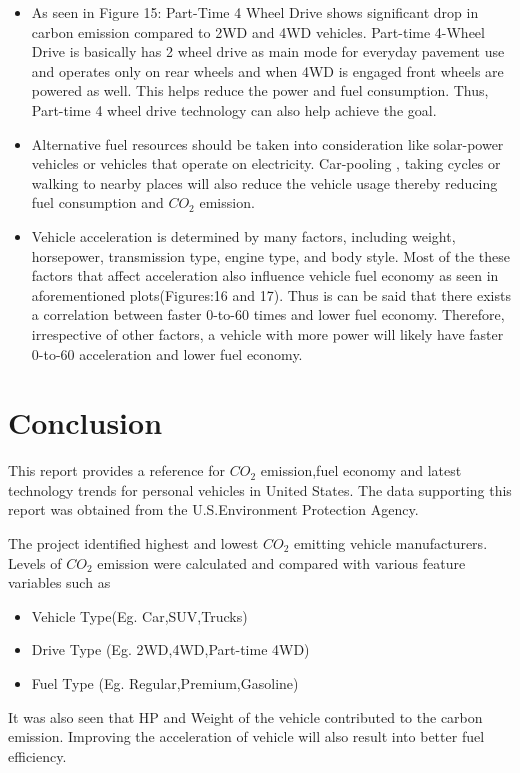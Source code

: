 \documentclass{acm_proc_article-sp}
\begin{document}
\begin{itemize}
    \item As seen in Figure 15: Part-Time 4 Wheel Drive shows significant drop in carbon emission compared to 2WD and 4WD vehicles. Part-time 4-Wheel Drive is basically has 2 wheel drive as main mode for everyday pavement use and operates  only on rear wheels and when 4WD is engaged front wheels are powered as well.\cite{Walczak} This helps reduce the power and fuel consumption. Thus, Part-time 4 wheel drive technology can also help achieve the goal.    
    
    \item Alternative fuel resources should be taken into consideration like solar-power vehicles or vehicles that operate on electricity. Car-pooling , taking cycles or walking to nearby places will also reduce the vehicle usage thereby reducing fuel consumption and $CO_{2}$ emission. 
    
    \item Vehicle acceleration is determined by many factors, including weight, horsepower, transmission type, engine type, and body style. Most of the these factors that affect acceleration also influence vehicle fuel economy as seen in aforementioned plots(Figures:16 and 17). Thus is can be said that there exists a correlation between faster 0-to-60 times and lower fuel economy. Therefore, irrespective of other factors, a vehicle with more power will likely have faster 0-to-60 acceleration and lower fuel economy.
    
\end{itemize}

\section{Conclusion}

This report provides a reference for $CO_{2}$ emission,fuel economy and latest technology trends for personal vehicles in United States. The data supporting this report was obtained from the U.S.Environment Protection Agency. 

The project identified highest and lowest $CO_{2}$ emitting vehicle manufacturers. Levels of $CO_{2}$ emission were calculated and compared with various feature variables such as \begin{itemize}
    \item Vehicle Type(Eg. Car,SUV,Trucks) 
    \item Drive Type (Eg. 2WD,4WD,Part-time 4WD) 
    \item Fuel Type (Eg. Regular,Premium,Gasoline)
\end{itemize}
It was also seen that HP and Weight of the vehicle contributed to the carbon emission. Improving the acceleration of vehicle will also result into better fuel efficiency. 
\end{document}
